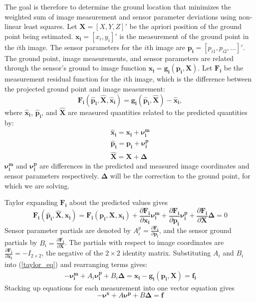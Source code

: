 \documentclass[10pt]{amsart}
\newcommand{\imgmeashat}{\pmb{\hat{x}_{i}}}
\newcommand{\imgmeas}{\pmb{x_{i}}}
\newcommand{\grndhat}{\pmb{\hat{X}}}
\newcommand{\grnd}{\pmb{X}}
\newcommand{\sensmeashat}{\pmb{\hat{p}_i}}
\newcommand{\sensmeas}{\pmb{p_i}}
\newcommand{\imgnu}{\pmb{\nu_{i}^m}}
\newcommand{\sensnu}{\pmb{\nu_i^p}}
\newcommand{\grndupdate}{\pmb{\Delta}}
\newcommand{\Fimgpartials}{\frac{\partial{\pmb{F_{i}}}}{\partial{\imgmeas}}}
\newcommand{\Fgrndpartials}{\frac{\partial{\pmb{F_{i}}}}{\partial{\grnd}}}
\newcommand{\Fsenspartials}{\frac{\partial{\pmb{F_{i}}}}{\partial{\sensmeas}}}
\begin{document}
The goal is therefore to determine the ground location that minimizes the weighted
sum of image measurement and sensor parameter deviations using non-linear least
squares. Let $\grnd = [X, Y, Z]'$ be the apriori position of the ground point
being estimated.  $\imgmeas = [x_{i}, y_{i}]'$ is the measurement of the ground
point in the $i$th image.  The sensor parameters for the $i$th image are
$\sensmeas = [p_{i1}, p_{i2}, \ldots]'$. The ground point, image measurements,
and sensor parameters are related through the sensor's ground to image function
$\imgmeas = \pmb{g_i}(\sensmeas, \grnd)$.  Let $\pmb{F_{i}}$ be the measurement
residual function for the $i$th image, which is the difference between the
projected ground point and image measurement:
\begin{equation*}
\pmb{F_{i}}(\sensmeashat, \grndhat,\imgmeashat)=\pmb{g_i}(\sensmeashat,\grndhat)-\imgmeashat,
\end{equation*}
where $\imgmeashat$, $\sensmeashat$, and $\grndhat$ are measured quantities
related to the predicted quantities by:
\begin{equation*}
\begin{split}
\imgmeashat = \imgmeas + \imgnu\\
\sensmeashat    = \sensmeas + \sensnu\\
\grndhat    = \grnd + \grndupdate
\end{split}
\end{equation*}
$\imgnu$ and $\sensnu$ are differences in the predicted and measured image
coordinates and sensor parameters respectively.  $\grndupdate$ will be the
correction to the ground point, for which we are solving.

Taylor expanding $\pmb{F_{i}}$ about the predicted values gives
\begin{equation} \label{taylor_eq}
\pmb{F_{i}}(\sensmeashat, \grndhat, \imgmeashat) = 
\pmb{F_{i}}(\sensmeas, \grnd, \imgmeas) + \Fimgpartials\imgnu + \Fsenspartials\sensnu + \Fgrndpartials\grndupdate = 0
\end{equation}
Sensor parameter partials are denoted by $A_{i}^p = \Fsenspartials$, and the
sensor ground partials by $B_{i} = \Fgrndpartials$.  The partials with respect
to image coordinates are ${\Fimgpartials=-I_{2 \times 2}}$, the negative of the
$2 \times 2$ identity matrix.  Substituting $A_{i}$ and $B_{i}$ into
(\ref{taylor_eq}) and rearranging terms gives:
\begin{equation} \label{linear_eq}
\begin{split}
-\imgnu + A_{i}\sensnu + B_{i}\grndupdate = \imgmeas - \pmb{g_i}(\sensmeas, \grnd) = \pmb{f_{i}}
\end{split}
\end{equation}
Stacking up equations for each measurement into one vector equation gives
\begin{equation}\label{stacked_eq}
-\pmb{\nu^x} + A\pmb{\nu^p} + B\grndupdate = \pmb{f}
\end{equation}
\end{document}
